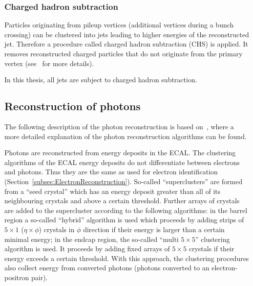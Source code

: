 \subsubsection*{Charged hadron subtraction}
Particles originating from pileup vertices (additional vertices during a bunch crossing) can be clustered into jets leading to higher energies of the reconstructed jet.
Therefore a procedure called charged hadron subtraction (CHS) is applied.
It removes reconstructed charged particles that do not originate from the primary vertex (see~\cite{bib:CHS_2012} for more details).

In this thesis, all jets are subject to charged hadron subtraction.

\subsection{Reconstruction of photons}
\label{subsec:PhotonReconstruction}
The following description of the photon reconstruction is based on~\cite{bib:CMS:PhotonIdentification_8TeV}, where a more detailed explanation of the photon reconstruction algorithms can be found.

Photons are reconstructed from energy deposits in the ECAL.
The clustering algorithms of the ECAL energy deposits do not differentiate between electrons and photons.
Thus they are the same as used for electron identification (Section~\ref{subsec:ElectronReconstruction}).
So-called ``superclusters'' are formed from a ``seed crystal'' which has an energy deposit greater than all of its neighbouring crystals and above a certain threshold.
Further arrays of crystals are added to the supercluster according to the following algorithms:
in the barrel region a so-called ``hybrid'' algorithm is used which proceeds by adding strips of $5 \times 1$ ($\eta \times \phi$) crystals in $\phi$ direction if their energy is larger than a certain minimal energy;
in the endcap region, the so-called ``multi $5 \times 5$'' clustering algorithm is used.
It proceeds by adding fixed arrays of $5 \times 5$ crystals if their energy exceeds a certain threshold.
With this approach, the clustering procedures also collect energy from converted photons (photons converted to an electron-positron pair).

